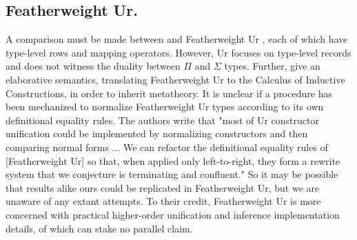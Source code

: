 \documentclass[sigplan,10pt,anonymous,review]{acmart}\settopmatter{printfolios=true,printccs=false,printacmref=false}
\begin{document}
\subsection{Featherweight Ur.} A comparison must be made between \Rome and Featherweight Ur \citep{Chlipala10}, each of which have type-level rows and mapping operators. However, Ur focuses on type-level records and does not witness the duality between $\Pi$ and $\Sigma$ types. Further, \citet{Chlipala10} give an elaborative semantics, translating Featherweight Ur to the Calculus of Inductive Constructions, in order to inherit metatheory. It is unclear if a procedure has been mechanized to normalize Featherweight Ur types according to its own definitional equality rules. The authors write that "most of Ur constructor unification could be implemented by normalizing constructors and then comparing normal forms ... We can refactor the definitional equality rules of [Featherweight Ur] so that, when applied only left-to-right, they form a rewrite system that we conjecture is terminating and confluent." So it may be possible that results alike ours could be replicated in Featherweight Ur, but we are unaware of any extant attempts. To their credit, Featherweight Ur is more concerned with practical higher-order unification and inference implementation details, of which \Rome can stake no parallel claim.



\end{document}
